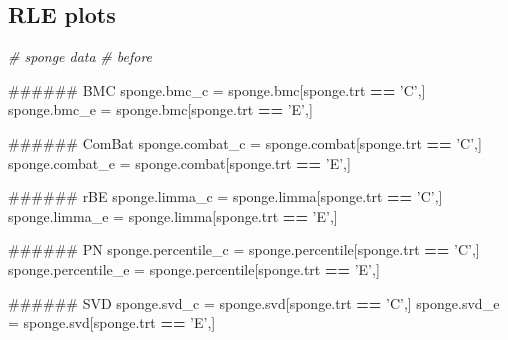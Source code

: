 \documentclass[]{book}
\newenvironment{Shaded}{\begin{snugshade}}{\end{snugshade}}
\newcommand{\StringTok}[1]{\textcolor[rgb]{0.31,0.60,0.02}{#1}}
\newcommand{\CommentTok}[1]{\textcolor[rgb]{0.56,0.35,0.01}{\textit{#1}}}
\newcommand{\OperatorTok}[1]{\textcolor[rgb]{0.81,0.36,0.00}{\textbf{#1}}}
\newcommand{\NormalTok}[1]{#1}
\begin{document}
\subsection{RLE plots}\label{rle-plots-1}

\begin{Shaded}
\begin{Highlighting}[]
\CommentTok{# sponge data}
\CommentTok{# before}

\NormalTok{###### BMC}
\NormalTok{sponge.bmc_c =}\StringTok{ }\NormalTok{sponge.bmc[sponge.trt }\OperatorTok{==}\StringTok{ 'C'}\NormalTok{,]}
\NormalTok{sponge.bmc_e =}\StringTok{ }\NormalTok{sponge.bmc[sponge.trt }\OperatorTok{==}\StringTok{ 'E'}\NormalTok{,] }

\NormalTok{###### ComBat}
\NormalTok{sponge.combat_c =}\StringTok{ }\NormalTok{sponge.combat[sponge.trt }\OperatorTok{==}\StringTok{ 'C'}\NormalTok{,]}
\NormalTok{sponge.combat_e =}\StringTok{ }\NormalTok{sponge.combat[sponge.trt }\OperatorTok{==}\StringTok{ 'E'}\NormalTok{,] }

\NormalTok{###### rBE}
\NormalTok{sponge.limma_c =}\StringTok{ }\NormalTok{sponge.limma[sponge.trt }\OperatorTok{==}\StringTok{ 'C'}\NormalTok{,]}
\NormalTok{sponge.limma_e =}\StringTok{ }\NormalTok{sponge.limma[sponge.trt }\OperatorTok{==}\StringTok{ 'E'}\NormalTok{,] }

\NormalTok{###### PN}
\NormalTok{sponge.percentile_c =}\StringTok{ }\NormalTok{sponge.percentile[sponge.trt }\OperatorTok{==}\StringTok{ 'C'}\NormalTok{,]}
\NormalTok{sponge.percentile_e =}\StringTok{ }\NormalTok{sponge.percentile[sponge.trt }\OperatorTok{==}\StringTok{ 'E'}\NormalTok{,] }

\NormalTok{###### SVD}
\NormalTok{sponge.svd_c =}\StringTok{ }\NormalTok{sponge.svd[sponge.trt }\OperatorTok{==}\StringTok{ 'C'}\NormalTok{,]}
\NormalTok{sponge.svd_e =}\StringTok{ }\NormalTok{sponge.svd[sponge.trt }\OperatorTok{==}\StringTok{ 'E'}\NormalTok{,] }
\end{Highlighting}
\end{Shaded}
\end{document}

